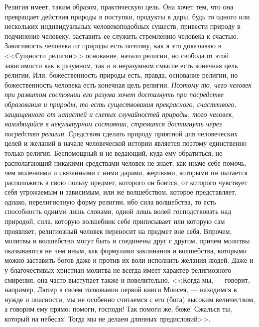 \documentclass[12pt]{article}
\begin{document}
Религия имеет, таким образом, практическую цель. Она хочет тем, что она превращает действия природы в поступки, продукты в дары, будь то одного или нескольких индивидуальных человекоподобных существ, привести природу в подчинение человеку, заставить ее служить стремлению человека к счастью. Зависимость человека от природы есть поэтому, как я это доказываю в <<Сущности религии>>  основание, начало религии, но свобода от этой зависимости как в разумном, так и в неразумном смысле есть конечная цель религии. Или: божественность природы есть, правда, основание религии, но божественность человека есть конечная цель религии. \emph{Поэтому то, чего человек при развитом состоянии его разума хочет достигнуть при посредстве образования и природы, то есть существования прекрасного, счастливого, защищенного от напастей и слепых случайностей природы, того человек, находящийся в некультурном состоянии, стремится достигнуть через посредство религии}. Средством сделать природу приятной для человеческих целей и желаний в начале человеческой истории является поэтому единственно только религия. Беспомощный и не ведающий, куда ему обратиться, не располагающий никакими средствами человек не знает, как иначе себе помочь, чем молениями и связанными с ними дарами, жертвами, которыми он пытается расположить в свою пользу предмет, которого он боится, от которого чувствует себя угрожаемым и зависимым, или же волшебством, которое представляет, однако, нерелигиозную форму религии, ибо сила волшебства, то есть способность одними лишь словами, одной лишь волей господствовать над природой, сила, которую волшебник себе приписывает или которую сам проявляет, религиозный человек переносит на предмет вне себя. Впрочем, молитвы и волшебство могут быть и соединены друг с другом, причем молитвы оказываются не чем иным, как формулами заклинания и волшебства, которыми можно заставить богов даже и против их воли исполнить желания людей. Даже и у благочестивых христиан молитва не всегда имеет характер религиозного смирения, она часто выступает также и повелительно. <<Когда мы, --- говорит, например, Лютер в своем толковании первой книги Моисея, --- находимся в нужде и опасности, мы не особенно считаемся с его (бога) высоким величеством, а говорим ему прямо: помоги, господи! Так помоги же, боже! Сжалься ты, который на небесах! Тогда мы не делаем длинных предисловий>>. 
\end{document}
